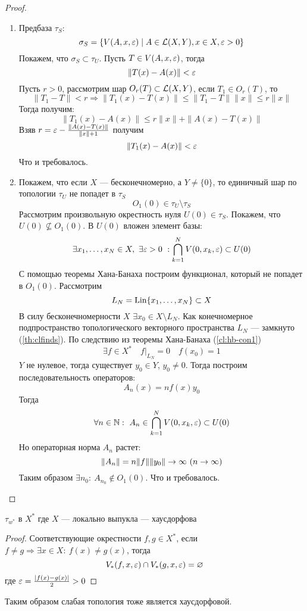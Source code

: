\begin{proof}
	\hfill
	\begin{enumerate}
		\item Предбаза $\tau_S$:
		$$
		\sigma_S = \{V(A,x, \varepsilon)\mid A \in \mathcal{L}(X,Y), x\in X, \varepsilon >0\}
		$$
		Покажем, что $\sigma_S \subset \tau_U$. Пусть $T \in V(A, x, \varepsilon)$, тогда
		$$
		\|T(x) - A(x)\| < \varepsilon
		$$ 
		Пусть $r > 0$, рассмотрим шар $O_r(T) \subset \mathcal{L}(X,Y)$, если $T_1 \in O_r(T)$, то 
		$$
		\|T_1 - T\| < r \Rightarrow \|T_1(x) - T(x)\| \leq \|T_1 - T\| \|x\| \leq r \|x\|
		$$
		Тогда получим:
		$$
		\|T_1(x) - A(x)\| \leq r\|x\| + \|A(x) - T(x)\| 
		$$
		Взяв $r =  \varepsilon - \frac{\|A(x) - T(x)\|}{\|x\| + 1}$ получим
		$$
		\|T_1(x) - A(x)\| < \varepsilon 
		$$
		Что и требовалось.
		\item Покажем, что если $X$ --- бесконечномерно, а $Y \neq \{0\}$, то единичный шар по топологии $\tau_U$ не попадет в $\tau_S$
		$$
		O_1(0) \in \tau_U\setminus \tau_S
		$$
		Рассмотрим произвольную окрестность нуля $U(0) \in \tau_S$. Покажем, что $U(0) \nsubseteq O_1(0)$. В $U(0)$ вложен элемент базы:
		$$
		\exists x_1, \dots, x_N \in X, \ \exists\varepsilon > 0 \ : \bigcap_{k=1}^N V(0, x_k, \varepsilon) \subset U(0)
		$$
		С помощью теоремы Хана-Банаха построим функционал, который не попадет в $O_1(0)$. Рассмотрим
		$$
		L_N = \operatorname{Lin} \{x_1, \dots, x_N\} \subset X
		$$
		В силу бесконечномерности $X$ $\exists x_0 \in X \setminus L_N$. Как конечномерное подпространство топологического векторного пространства $L_N$ --- замкнуто (\ref{th:clfinds}). По следствию из теоремы Хана-Банаха (\ref{cl:hb-con1}) 
		$$
		\exists f \in X^* \quad f|_{L_N} = 0 \quad f(x_0) = 1
		$$
		$Y$ не нулевое, тогда существует $y_0 \in Y$, $y_0 \neq 0$. Тогда построим последовательность операторов:
		$$
		A_n(x) = nf(x)y_0
		$$
		Тогда 
		$$
		\forall n \in \mathbb{N}: \ A_n \in \bigcap_{k=1}^N V(0, x_k, \varepsilon) \subset U(0)
		$$
		Но операторная норма $A_n$ растет:
		$$
		\|A_n\| = n\|f\|\|y_0\| \rightarrow \infty \ (n \rightarrow \infty)
		$$
		Таким образом $\exists n_0: \ A_{n_0} \notin O_1(0)$. Что и требовалось.
	\end{enumerate}
\end{proof}


\begin{claim}
	$\tau_{w^*}$ в $X^*$ где $X$ --- локально выпукла --- хаусдорфова
\end{claim}
\begin{proof}
	Соответствующие окрестности $f,g \in X^*$, если $f \neq g \Rightarrow \exists x \in X: \ f(x) \neq g(x)$, тогда
	$$
	V_*(f,x,\varepsilon) \cap V_*(g,x,\varepsilon) = \varnothing
	$$
	где $\varepsilon = \frac{|f(x) - g(x)|}{2} > 0$
\end{proof}
Таким образом слабая топология тоже является хаусдорфовой. 

